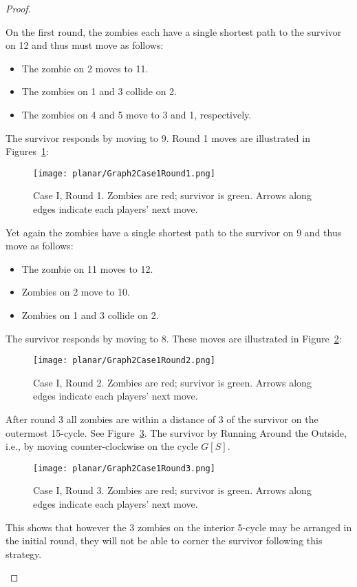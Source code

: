 \begin{proof}
\begin{description}
On the first round, the zombies each have a single shortest path to the survivor on 12 and thus must move as follows:

\begin{itemize}
\item The zombie on 2 moves to 11.
\item The zombies on 1 and 3 collide on 2.
\item The zombies on 4 and 5 move to 3 and 1, respectively.
\end{itemize}

The survivor responds by moving to 9. Round 1 moves are illustrated in Figures~\ref{fig:planarG2C1R1}:
\begin{figure}
\centering
\texttt{[image: planar/Graph2Case1Round1.png]}
\caption{Case I, Round 1. Zombies are red; survivor is green. Arrows along edges indicate each players' next move.\label{fig:planarG2C1R1}}
\end{figure}

Yet again the zombies have a single shortest path to the survivor on 9 and thus move as follows:
\begin{itemize}
\item The zombie on 11 moves to 12.
\item Zombies on 2 move to 10.
\item Zombies on 1 and 3 collide on 2.
\end{itemize}

The survivor responds by moving to 8. These moves are illustrated in Figure~\ref{fig:planarG2C1R2}:
\begin{figure}
\centering
\texttt{[image: planar/Graph2Case1Round2.png]}
\caption{Case I, Round 2. Zombies are red; survivor is green. Arrows along edges indicate each players' next move.\label{fig:planarG2C1R2}}
\end{figure}

After round 3 all zombies are within a distance of 3 of the survivor on the outermost 15-cycle. See Figure~\ref{fig:planarG2C1R3}. The survivor by Running Around the Outside, i.e., by moving counter-clockwise on the cycle $G[S]$.

\begin{figure}
\centering
\texttt{[image: planar/Graph2Case1Round3.png]}
\caption{Case I, Round 3. Zombies are red; survivor is green. Arrows along edges indicate each players' next move.\label{fig:planarG2C1R3}}
\end{figure}

This shows that however the 3 zombies on the interior 5-cycle may be arranged in the initial round, they will not be able to corner the survivor following this strategy.


\end{description}
\end{proof}
